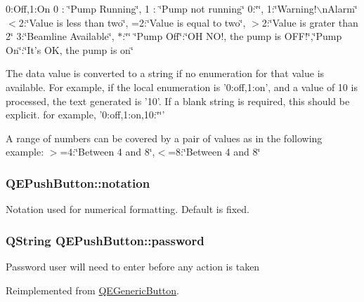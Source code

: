 0:Off,1:On 0 : \char`\"{}Pump Running\char`\"{}, 1 : \char`\"{}Pump not running\char`\"{} 0:\char`\"{}\char`\"{}, 1:\char`\"{}Warning!$\backslash$nAlarm\char`\"{} $<$2:\char`\"{}Value is less than two\char`\"{}, =2:\char`\"{}Value is equal to two\char`\"{}, $>$2:\char`\"{}Value is grater than 2\char`\"{} 3:\char`\"{}Beamline Available\char`\"{}, $\ast$:\char`\"{}\char`\"{} \char`\"{}Pump Off\char`\"{}:\char`\"{}OH NO!, the pump is OFF!\char`\"{},\char`\"{}Pump On\char`\"{}:\char`\"{}It's OK, the pump is on\char`\"{}

The data value is converted to a string if no enumeration for that value is available. For example, if the local enumeration is '0:off,1:on', and a value of 10 is processed, the text generated is '10'. If a blank string is required, this should be explicit. for example, '0:off,1:on,10:\char`\"{}\char`\"{}'

A range of numbers can be covered by a pair of values as in the following example: $>$=4:\char`\"{}Between 4 and 8\char`\"{},$<$=8:\char`\"{}Between 4 and 8\char`\"{} \hypertarget{classQEPushButton_a180f3a67ef06214e07fd5d59e49e1793}{
\subsubsection[{notation}]{ QEPushButton::notation}}
\label{classQEPushButton_a180f3a67ef06214e07fd5d59e49e1793}
Notation used for numerical formatting. Default is fixed. \hypertarget{classQEPushButton_ae64440ff4fbd449726f83c302be8f12a}{
\subsubsection[{password}]{\setlength{\rightskip}{0pt plus 5cm}QString QEPushButton::password}}
\label{classQEPushButton_ae64440ff4fbd449726f83c302be8f12a}
Password user will need to enter before any action is taken 

Reimplemented from \hyperlink{classQEGenericButton}{QEGenericButton}.

